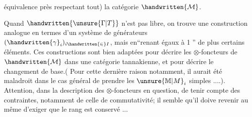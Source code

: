 équivalence près\deleted{)} respectant tout) la catégorie $\handwritten{\mathcal{M}}$.

Quand $\handwritten{\unsure{\Gamma|T}}$ n'est pas libre, on trouve une construction analogue en termes d'un système de générateurs $(\handwritten{\gamma}_i)_{i\handwritten{\in}I}$, mais en``renant  égaux à 1 '' de plus certains éléments. Ces constructions sont bien adaptées pour décrire les $\otimes$-foncteurs de $\handwritten{\mathcal{M}}$ dans une \deleted{$\otimes$-}catégorie tannakienne, et pour décrire le changement de base.( Pour cette dernière raison notamment, il aurait été maladroit dans le cas général de prendre les $\unsure{\mathbb{M}|M}_i$ simples ....). Attention, dans la description des $\otimes$-foncteurs en question, de tenir compte des contraintes, notamment de celle de commutativité; il semble qu'il doive revenir au même d'exiger que le rang est conservé ...
